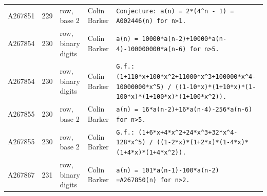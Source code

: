 \documentclass[11pt]{article}
\theoremstyle{definition}
\theoremstyle{remark}
\begin{document}
{\begin{longtable}{p{1.3cm}p{0.7cm}p{2.4cm}p{2.3cm}p{7.3cm}}
A267851 & 229 & row, base 2 & Colin Barker & \texttt{Conjecture: \allowbreak{}a(n)\allowbreak{} \allowbreak{}=\allowbreak{} \allowbreak{}2*\allowbreak{}(4\^{}n \allowbreak{}-\allowbreak{} \allowbreak{}1)\allowbreak{} \allowbreak{}=\allowbreak{} \allowbreak{}A002446(n)\allowbreak{} \allowbreak{}for \allowbreak{}n>1.} \\
A267854 & 230 & row, binary digits & Colin Barker & \texttt{a(n)\allowbreak{} \allowbreak{}=\allowbreak{} \allowbreak{}10000*\allowbreak{}a(n-\allowbreak{}2)\allowbreak{}+\allowbreak{}10000*\allowbreak{}a(n-\allowbreak{}4)\allowbreak{}-\allowbreak{}100000000*\allowbreak{}a(n-\allowbreak{}6)\allowbreak{} \allowbreak{}for \allowbreak{}n>5.} \\
A267854 & 230 & row, binary digits & Colin Barker & \texttt{G.f.: \allowbreak{}(1+\allowbreak{}110*\allowbreak{}x+\allowbreak{}100*\allowbreak{}x\^{}2+\allowbreak{}11000*\allowbreak{}x\^{}3+\allowbreak{}100000*\allowbreak{}x\^{}4-\allowbreak{}10000000*\allowbreak{}x\^{}5)\allowbreak{} \allowbreak{}/\allowbreak{} \allowbreak{}((1-\allowbreak{}10*\allowbreak{}x)\allowbreak{}*\allowbreak{}(1+\allowbreak{}10*\allowbreak{}x)\allowbreak{}*\allowbreak{}(1-\allowbreak{}100*\allowbreak{}x)\allowbreak{}*\allowbreak{}(1+\allowbreak{}100*\allowbreak{}x)\allowbreak{}*\allowbreak{}(1+\allowbreak{}100*\allowbreak{}x\^{}2)\allowbreak{})\allowbreak{}.} \\
A267855 & 230 & row, base 2 & Colin Barker & \texttt{a(n)\allowbreak{} \allowbreak{}=\allowbreak{} \allowbreak{}16*\allowbreak{}a(n-\allowbreak{}2)\allowbreak{}+\allowbreak{}16*\allowbreak{}a(n-\allowbreak{}4)\allowbreak{}-\allowbreak{}256*\allowbreak{}a(n-\allowbreak{}6)\allowbreak{} \allowbreak{}for \allowbreak{}n>5.} \\
A267855 & 230 & row, base 2 & Colin Barker & \texttt{G.f.: \allowbreak{}(1+\allowbreak{}6*\allowbreak{}x+\allowbreak{}4*\allowbreak{}x\^{}2+\allowbreak{}24*\allowbreak{}x\^{}3+\allowbreak{}32*\allowbreak{}x\^{}4-\allowbreak{}128*\allowbreak{}x\^{}5)\allowbreak{} \allowbreak{}/\allowbreak{} \allowbreak{}((1-\allowbreak{}2*\allowbreak{}x)\allowbreak{}*\allowbreak{}(1+\allowbreak{}2*\allowbreak{}x)\allowbreak{}*\allowbreak{}(1-\allowbreak{}4*\allowbreak{}x)\allowbreak{}*\allowbreak{}(1+\allowbreak{}4*\allowbreak{}x)\allowbreak{}*\allowbreak{}(1+\allowbreak{}4*\allowbreak{}x\^{}2)\allowbreak{})\allowbreak{}.} \\
A267867 & 231 & row, binary digits & Colin Barker & \texttt{a(n)\allowbreak{} \allowbreak{}=\allowbreak{} \allowbreak{}101*\allowbreak{}a(n-\allowbreak{}1)\allowbreak{}-\allowbreak{}100*\allowbreak{}a(n-\allowbreak{}2)\allowbreak{} \allowbreak{}=\allowbreak{}A267850(n)\allowbreak{} \allowbreak{}for \allowbreak{}n>2.} \\

\end{longtable}}
\end{document}
